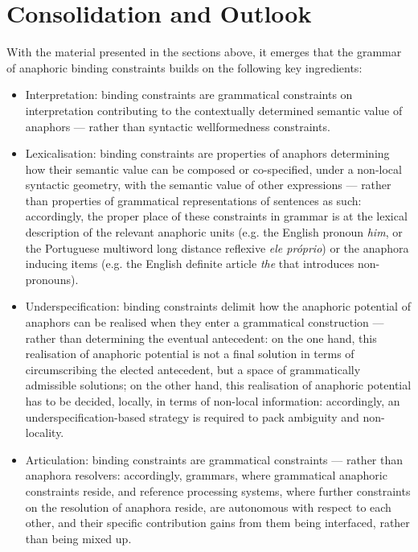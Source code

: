 \documentclass[output=paper
,modfonts
,nonflat]{langsci/langscibook}
\begin{document}
\section{Consolidation and Outlook \label{outlook}}


With the material presented in the sections above, it emerges that the grammar 
of anaphoric binding constraints builds on the following key ingredients:


\begin{itemize}

\item Interpretation: binding constraints are grammatical constraints on interpretation 
contributing to the contextually determined
semantic value of anaphors --- rather than syntactic wellformedness constraints.

\item Lexicalisation: binding constraints are properties of 
anaphors determining how their semantic value 
can be composed or co-specified, under a non-local syntactic geometry, with the
semantic value of other expressions --- rather than properties of grammatical
representations of sentences as such: accordingly, the
proper place of these constraints in grammar is at the lexical description of 
the relevant anaphoric units (e.g. the English pronoun {\em him}, or the Portuguese multiword long distance reflexive {\em ele pr\'{o}prio}) or the anaphora inducing items (e.g. the English definite article {\em the} that introduces non-pronouns).

\item Underspecification: binding constraints delimit how the
anaphoric potential of anaphors can be realised when they
enter a grammatical construction --- rather than determining the eventual antecedent: 
on the one hand, this realisation of anaphoric potential is not a final solution in terms of circumscribing
the elected antecedent, but a space of grammatically admissible solutions;
on the other hand, this realisation of anaphoric potential has to be decided, locally,
in terms of non-local information: accordingly, an underspecification-based
strategy is required to pack ambiguity and non-locality.

\item Articulation: binding constraints are grammatical constraints --- rather than 
anaphora resolvers: accordingly, grammars, where grammatical ana\-phoric
constraints reside, and reference processing systems, where further
constraints on the resolution of anaphora reside,
are autonomous with respect to each other, and their specific contribution gains
from them being interfaced, rather than being mixed up.
\end{itemize}
\end{document}
